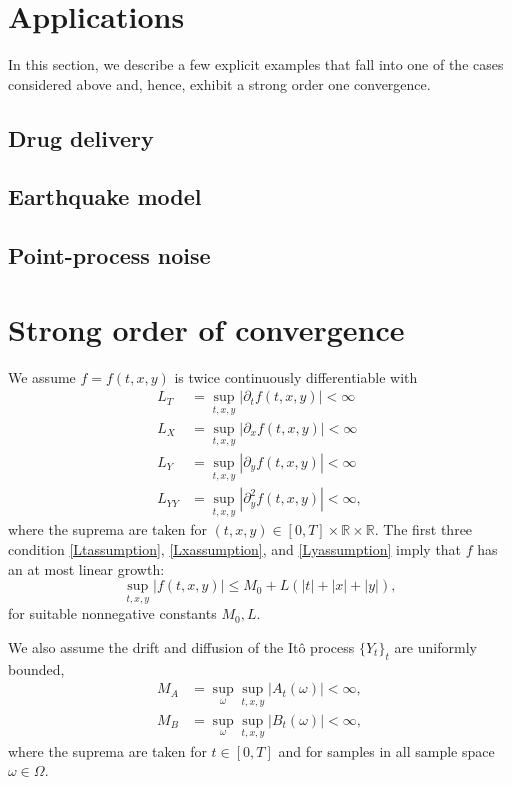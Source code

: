 \documentclass[reqno,12pt]{amsart}
\theoremstyle{plain}%
\theoremstyle{definition}
\begin{document}
\section{Applications}

In this section, we describe a few explicit examples that fall into one of the cases considered above and, hence, exhibit a strong order one convergence.

\subsection{Drug delivery}

\subsection{Earthquake model}

\subsection{Point-process noise}



\section{Strong order of convergence}

We assume $f=f(t, x, y)$ is twice continuously differentiable with
\begin{align}
  \label{Ltassumption} L_T & = \sup_{t, x, y} |\partial_t f(t, x, y)| < \infty \\
  \label{Lxassumption} L_X & = \sup_{t, x, y} |\partial_x f(t, x, y)| < \infty \\
  \label{Lyassumption} L_Y & = \sup_{t, x, y} |\partial_y f(t, x, y)| < \infty \\
  \label{Lyyassumption} L_{YY} & = \sup_{t, x, y} |\partial_y^2 f(t, x, y)| < \infty,
\end{align}
where the suprema are taken for $(t, x, y) \in [0, T] \times \mathbb{R} \times \mathbb{R}$. The first three condition \eqref{Ltassumption}, \eqref{Lxassumption}, and \eqref{Lyassumption} imply that $f$ has an at most linear growth:
\begin{equation}
    \label{Mfassumption}
    \sup_{t, x, y} |f(t, x, y)| \leq M_0 + L(|t| + |x| + |y|),
\end{equation}
for suitable nonnegative constants $M_0, L$.

We also assume the drift and diffusion of the It\^o process $\{Y_t\}_t$ are uniformly bounded,
\begin{align}
  \label{MAassumption} M_A & = \sup_\omega \sup_{t, x, y} |A_t(\omega)| < \infty, \\
  \label{MBassumption} M_B & = \sup_\omega\sup_{t, x, y} |B_t(\omega)| < \infty,
\end{align}
where the suprema are taken for $t\in [0, T]$ and for samples in all sample space $\omega\in \Omega$.
\end{document}
